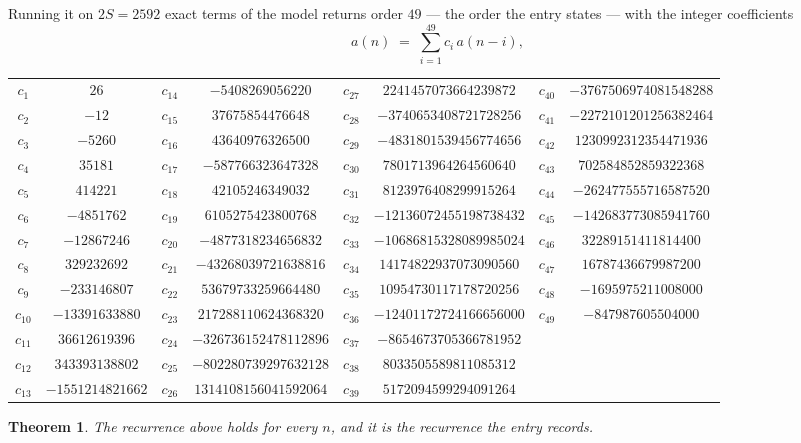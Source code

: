 \documentclass[11pt,a4paper]{article}
\theoremstyle{plain}
\newtheorem{theorem}{Theorem}
\theoremstyle{definition}
\begin{document}
Running it on $2S=2592$ exact terms of the model returns order $49$ --- the order the
entry states --- with the integer coefficients
\[
a(n)\;=\;\sum_{i=1}^{49}c_i\,a(n-i),
\]
\begin{center}\small
\begin{tabular}{cccccccc}
$c_{1}$ & $26$ & $c_{14}$ & $-5408269056220$ & $c_{27}$ & $2241457073664239872$ & $c_{40}$ & $-3767506974081548288$ \\
$c_{2}$ & $-12$ & $c_{15}$ & $37675854476648$ & $c_{28}$ & $-3740653408721728256$ & $c_{41}$ & $-2272101201256382464$ \\
$c_{3}$ & $-5260$ & $c_{16}$ & $43640976326500$ & $c_{29}$ & $-4831801539456774656$ & $c_{42}$ & $1230992312354471936$ \\
$c_{4}$ & $35181$ & $c_{17}$ & $-587766323647328$ & $c_{30}$ & $7801713964264560640$ & $c_{43}$ & $702584852859322368$ \\
$c_{5}$ & $414221$ & $c_{18}$ & $42105246349032$ & $c_{31}$ & $8123976408299915264$ & $c_{44}$ & $-262477555716587520$ \\
$c_{6}$ & $-4851762$ & $c_{19}$ & $6105275423800768$ & $c_{32}$ & $-12136072455198738432$ & $c_{45}$ & $-142683773085941760$ \\
$c_{7}$ & $-12867246$ & $c_{20}$ & $-4877318234656832$ & $c_{33}$ & $-10686815328089985024$ & $c_{46}$ & $32289151411814400$ \\
$c_{8}$ & $329232692$ & $c_{21}$ & $-43268039721638816$ & $c_{34}$ & $14174822937073090560$ & $c_{47}$ & $16787436679987200$ \\
$c_{9}$ & $-233146807$ & $c_{22}$ & $53679733259664480$ & $c_{35}$ & $10954730117178720256$ & $c_{48}$ & $-1695975211008000$ \\
$c_{10}$ & $-13391633880$ & $c_{23}$ & $217288110624368320$ & $c_{36}$ & $-12401172724166656000$ & $c_{49}$ & $-847987605504000$ \\
$c_{11}$ & $36612619396$ & $c_{24}$ & $-326736152478112896$ & $c_{37}$ & $-8654673705366781952$ &  &  \\
$c_{12}$ & $343393138802$ & $c_{25}$ & $-802280739297632128$ & $c_{38}$ & $8033505589811085312$ &  &  \\
$c_{13}$ & $-1551214821662$ & $c_{26}$ & $1314108156041592064$ & $c_{39}$ & $5172094599294091264$ &  &  \\
\end{tabular}
\end{center}

\begin{theorem}
The recurrence above holds for every $n$, and it is the recurrence the entry records.
\end{theorem}
\end{document}
